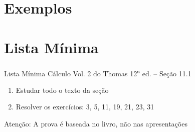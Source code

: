 \documentclass[fleqn,utf8,aspectratio=169,12pt]{beamer}
\begin{document}
\section{Exemplos}











\section{Lista Mínima}

\begin{frame}{Lista Mínima}
  Cálculo Vol. 2 do Thomas 12\textsuperscript{a} ed. -- Seção 11.1
  \begin{enumerate}
    \item Estudar todo o texto da seção
    \item Resolver os exercícios: 3, 5, 11, 19, 21, 23, 31
  \end{enumerate}

  \vfill
  Atenção: A prova é baseada no livro, não nas apresentações
\end{frame}

\end{document}

